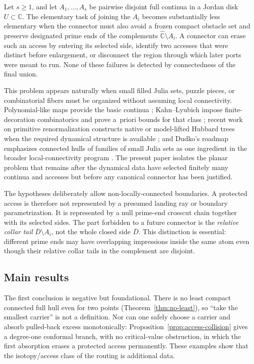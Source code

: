 \documentclass[11pt,reqno]{amsart}
\theoremstyle{definition}
\theoremstyle{remark}
\newcommand{\C}{\mathbb C}
\newcommand{\Chat}{\widehat{\mathbb C}}
\begin{document}
Let $s\ge1$, and let $A_1,\dots,A_s$ be pairwise disjoint full continua in a Jordan disk
$U\subset\C$.  The elementary task of joining the $A_i$ becomes substantially
less elementary when the connector must also avoid a frozen compact obstacle
set and preserve designated prime ends of the complements
$\Chat\setminus A_i$.  A connector can erase such an access by entering its
selected side, identify two accesses that were distinct before enlargement,
or disconnect the region through which later ports were meant to run.
None of these failures is detected by connectedness of the final union.

This problem appears naturally when small filled Julia sets, puzzle pieces,
or combinatorial fibers must be organized without assuming local
connectivity.  Polynomial-like maps provide the basic continua
\cite{DH85}; Kahn--Lyubich impose finite-decoration combinatorics and
prove a~priori bounds for that class \cite{KL08}; recent work on
primitive renormalization constructs native or model-lifted Hubbard trees
when the required dynamical structure is available \cite{KKL26}; and
Dudko's roadmap emphasizes connected hulls of families of small Julia sets
as one ingredient in the broader local-connectivity program \cite{Dud25}.
The present paper isolates the planar problem that remains after the
dynamical data have selected finitely many continua and accesses but before
any canonical connector has been justified.

The hypotheses deliberately allow non-locally-connected boundaries.
A protected access is therefore not represented by a presumed landing ray
or boundary parametrization.  It is represented by a null prime-end
crosscut chain together with its selected sides.  The part forbidden to a
future connector is the \emph{relative collar tail}
$\overline D\setminus A_i$, not the whole closed side $\overline D$.
This distinction is essential: different prime ends may have overlapping
impressions inside the same atom even though their relative collar tails in
the complement are disjoint.

\subsection{Main results}

The first conclusion is negative but foundational.  There is no least
compact connected full hull even for two points
(Theorem~\ref{thm:no-least}), so ``take the smallest carrier'' is not a
definition.  Nor can one safely choose a carrier and absorb pulled-back
excess monotonically: Proposition~\ref{prop:access-collision} gives a
degree-one conformal branch, with no critical-value obstruction, in which
the first absorption erases a protected access permanently.  These examples
show that the isotopy/access class of the routing is additional data.
\end{document}

